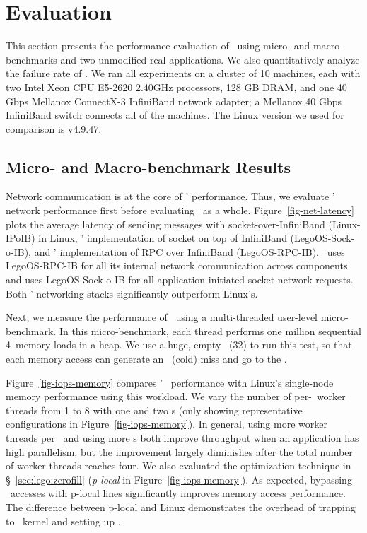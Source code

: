 \section{Evaluation}
\label{sec:lego:results}

This section presents the performance evaluation of \lego\ using micro- and macro-benchmarks and two unmodified real applications.
We also quantitatively analyze the failure rate of \lego.
We ran all experiments on a cluster of 10 machines, each with two Intel Xeon CPU E5-2620 2.40GHz
processors, 128 GB DRAM, and one 40 Gbps Mellanox ConnectX-3 InfiniBand network adapter;
a Mellanox 40 Gbps InfiniBand switch connects all of the machines. 
The Linux version we used for comparison is v4.9.47.

\subsection{Micro- and Macro-benchmark Results}
Network communication is at the core of \lego' performance.
Thus, we evaluate \lego' network performance first before evaluating \lego\ as a whole.
Figure~\ref{fig-net-latency} plots the average latency of sending messages with socket-over-InfiniBand (Linux-IPoIB) in Linux,
\lego' implementation of socket on top of InfiniBand (LegoOS-Sock-o-IB), and \lego' implementation of RPC over InfiniBand (LegoOS-RPC-IB).
\lego\ uses LegoOS-RPC-IB for all its internal network communication across components and uses LegoOS-Sock-o-IB for 
all application-initiated socket network requests.
Both \lego' networking stacks significantly outperform Linux's.

Next, we measure the performance of \mcomponent\ using a multi-threaded user-level micro-benchmark. 
In this micro-benchmark, each thread performs one million sequential 4\KB\ memory loads in a heap.
We use a huge, empty \excache\ (32\GB) to run this test, 
so that each memory access can generate an \excache\ (cold) miss and go to the \mcomponent.

Figure~\ref{fig-iops-memory} compares \lego' \mcomponent\ performance 
with Linux's single-node memory performance using this workload.
We vary the number of per-\mcomponent\ worker threads from 1 to 8 
with one and two \mcomponent{}s (only showing representative configurations in Figure~\ref{fig-iops-memory}).
In general, using more worker threads per \mcomponent\ and using more \mcomponent{}s both improve throughput when an application has high parallelism,
but the improvement largely diminishes after the total number of worker threads reaches four.
We also evaluated the optimization technique in \S~\ref{sec:lego:zerofill} ({\em p-local} in Figure~\ref{fig-iops-memory}).
As expected, bypassing \mcomponent\ accesses with p-local lines significantly 
improves memory access performance.
The difference between p-local and Linux demonstrates the overhead of trapping to \lego\ kernel and setting up \excache.

